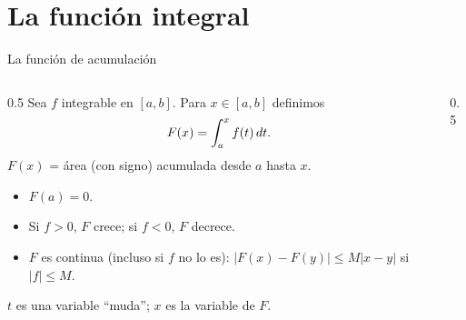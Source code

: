 \documentclass[10pt,aspectratio=169]{beamer}
\begin{document}
\section{La función integral}

\begin{frame}{La función de acumulación}
  \begin{columns}
    \begin{column}{0.5\textwidth}
      Sea $f$ integrable en $[a,b]$. Para $x\in[a,b]$ definimos
      \[ F(x)=\int_a^xf(t)\,dt. \]
      $F(x)$ = área (con signo) acumulada desde $a$ hasta $x$.
      \begin{itemize}
        \item $F(a)=0$.
        \item Si $f>0$, $F$ crece; si $f<0$, $F$ decrece.
        \item $F$ es continua (incluso si $f$ no lo es): $|F(x)-F(y)|\le M|x-y|$ si $|f|\le M$.
      \end{itemize}
      \begin{observacion}
        $t$ es una variable ``muda''; $x$ es la variable de $F$.
      \end{observacion}
    \end{column}
    \begin{column}{0.5\textwidth}
      \centering
    \end{column}
  \end{columns}
\end{frame}
\end{document}
